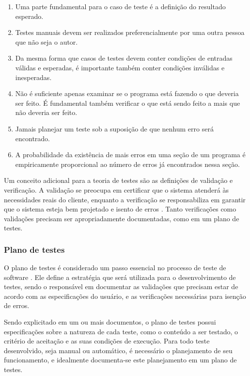 \begin{enumerate}
    \item Uma parte fundamental para o caso de teste é a definição do resultado esperado.
    \item Testes manuais devem ser realizados preferencialmente por uma outra pessoa que não seja o autor.
    \item Da mesma forma que casos de testes devem conter condições de entradas válidas e esperadas, é importante também conter condições inválidas e inesperadas.
    \item Não é suficiente apenas examinar se o programa está fazendo o que deveria ser feito. É fundamental também verificar o que está sendo feito a mais que não deveria ser feito.
    \item Jamais planejar um teste sob a suposição de que nenhum erro será encontrado.
    \item A probabilidade da existência de mais erros em uma seção de um programa é empiricamente proporcional ao número de erros já encontrados nessa seção.
\end{enumerate}

Um conceito adicional para a teoria de testes são as definições de validação e verificação. A validação se preocupa em certificar que o sistema atenderá às necessidades reais do cliente, enquanto a verificação se responsabiliza em garantir que o sistema esteja bem projetado e isento de erros \cite{pham2003software}. Tanto verificações como validações precisam ser apropriadamente documentadas, como em um plano de testes.

\hypertarget{teoria-do-plano-de-testes}{%
\subsubsection{Plano de testes}\label{teoria-do-plano-de-testes}}

O plano de testes é considerado um passo essencial no processo de teste de software \cite{nguyen}. Ele define a estratégia que será utilizada para o desenvolvimento de testes, sendo o responsável em documentar as validações que precisam estar de acordo com as especificações do usuário, e as verificações necessárias para isenção de erros.

Sendo explicitado em um ou mais documentos, o plano de testes possui especificações sobre a natureza de cada teste, como o conteúdo a ser testado, o critério de aceitação e as suas condições de execução. Para todo teste desenvolvido, seja manual ou automático, é necessário o planejamento de seu funcionamento, e idealmente documenta-se este planejamento em um plano de testes.

